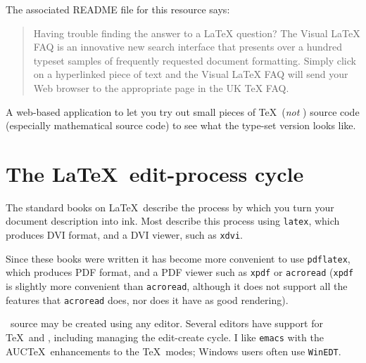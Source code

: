 \documentclass[authoryearcitations]{UoYCSproject}
\begin{document}
\begin{description}

  The associated README file for this resource says:
  \begin{quote}\small
    Having trouble finding the answer to a LaTeX question?  The Visual
    LaTeX FAQ is an innovative new search interface that presents over
    a hundred typeset samples of frequently requested document
    formatting.  Simply click on a hyperlinked piece of text and the
    Visual LaTeX FAQ will send your Web browser to the appropriate
    page in the UK TeX FAQ.
  \end{quote}


A web-based application to let you try out small pieces of \TeX\
(\emph{not} \LaTeXe) source code (especially mathematical source code)
to see what the type-set version looks like.
\end{description}

\cleardoublepage
\chapter{The \LaTeX\ edit-process cycle}
\label{cha:editprocess}

The standard books on \LaTeX\ describe the process by which you turn
your document description into ink.  Most describe this process using
\lstinline|latex|, which produces DVI format, and a DVI viewer, such
as \lstinline|xdvi|.

Since these books were written it has become more convenient to use
\lstinline|pdflatex|, which produces PDF format, and a PDF viewer such
as \lstinline|xpdf| or \lstinline|acroread| (\lstinline|xpdf| is
slightly more convenient than \lstinline|acroread|, although it does
not support all the features that \lstinline|acroread| does, nor does
it have as good rendering).

\LaTeXe\ source may be created using any editor.  Several editors have
support for \TeX\ and \LaTeXe, including managing the edit-create
cycle.  I like \lstinline|emacs| with the AUC\TeX\ enhancements to the
\TeX\ modes; Windows users often use \lstinline|WinEDT|.
\end{document}
